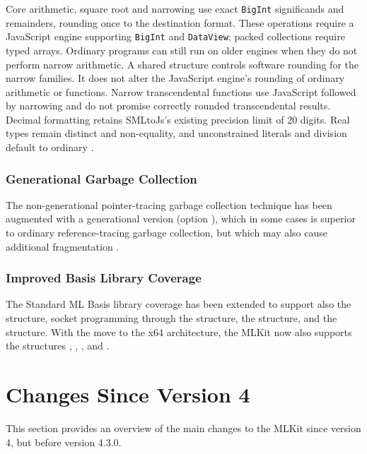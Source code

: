 \documentclass[12pt]{book}
\begin{document}
Core arithmetic, square root and narrowing use exact \texttt{BigInt}
significands and remainders, rounding once to the destination format. These
operations require a JavaScript engine supporting \texttt{BigInt} and
\texttt{DataView}; packed collections require typed arrays. Ordinary programs
can still run on older engines when they do not perform narrow arithmetic.
A shared  structure controls software rounding for the narrow
families. It does not alter the JavaScript engine's rounding of ordinary
 arithmetic or  functions. Narrow transcendental functions
use JavaScript  followed by narrowing and do not promise correctly
rounded transcendental results. Decimal formatting retains SMLtoJs's existing
precision limit of 20 digits. Real types remain distinct and non-equality,
and unconstrained literals and division default to ordinary .

\subsubsection*{Generational Garbage Collection}
%

The non-generational pointer-tracing garbage collection technique has been
augmented with a generational version (option ), which in some cases
is superior to ordinary reference-tracing garbage collection, but which may also
cause additional fragmentation \cite{elshaljfp21}.

\subsubsection*{Improved Basis Library Coverage}

The Standard ML Basis library coverage has been extended to support also the
 structure, socket programming through the
%
%
%
 structure, the  structure, and the 
structure. With the move to the x64 architecture, the MLKit now also supports
the structures , , , and .


\section{Changes Since Version 4}
%
%
This section provides an overview of the main changes to the MLKit since version
4, but before version 4.3.0.
\end{document}
